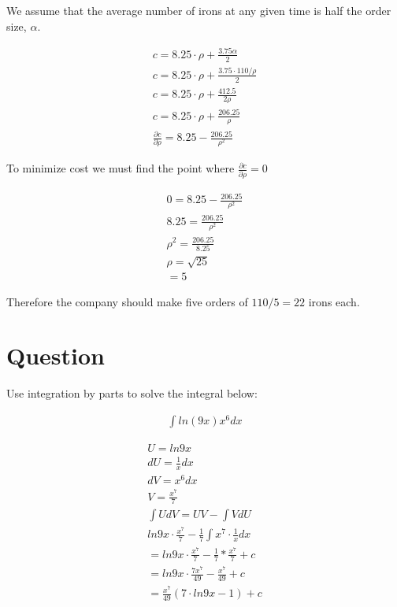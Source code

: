 \documentclass[12pt]{article}
\begin{document}
We assume that the average number of irons at any given time is half the order
size, $\alpha$.

\setcounter{equation}{0}
\begin{align}
  c=8.25 \cdot \rho + \frac{3.75 \alpha}{2}
  \\
  c=8.25 \cdot \rho + \frac{3.75 \cdot 110/\rho}{2}
  \\
  c=8.25 \cdot \rho + \frac{412.5}{2\rho}
  \\
  c=8.25 \cdot \rho + \frac{206.25}{\rho}
  \\
  \frac{\partial c}{\partial \rho} = 8.25 - \frac{206.25}{\rho^2}
\end{align}

To minimize cost we must find the point where $\frac{\partial c}{\partial \rho} = 0$

\begin{align}
  0= 8.25 - \frac{206.25}{\rho^2}
  \\
  8.25 = \frac{206.25}{\rho^2}
  \\
  \rho^2 = \frac{206.25}{8.25}
  \\
  \rho = \sqrt{25}
  \\
  =5
\end{align}

Therefore the company should make five orders of $110/5=22$ irons each.

\section{Question}
\label{sec:q6}

Use integration by parts to solve the integral below:

\begin{align*}
  \int ln(9x)x^6dx
\end{align*}

\setcounter{equation}{0}
\begin{align}
  U= ln9x
  \\
  dU=\frac{1}{x}dx
  \\
  dV=x^6dx
  \\
  V =\frac{x^7}{7}
  \\
  \int UdV = UV - \int VdU
  \\
  ln9x \cdot \frac{x^7}{7} - \frac{1}{7} \int x^7 \cdot \frac{1}{x} dx
  \\
  = ln9x \cdot \frac{x^7}{7} - \frac{1}{7} * \frac{x^7}{7}+c
  \\
  = ln9x \cdot \frac{7x^7}{49} -  \frac{x^7}{49}+c
  \\
  = \frac{x^7}{49}(7 \cdot ln9x - 1) +c
\end{align}
\end{document}
